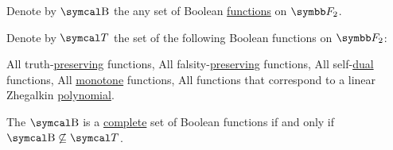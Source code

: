 \begin{Theorem}\label{thm:posts_completeness_theorem}\cite{Pelletier1990}
  Denote by \( \CB \) the any set of Boolean \hyperref[def:boolean_function]{functions} on \( \BF_2 \).

  Denote by \( \Cal{T} \) the set of the following Boolean functions on \( \BF_2 \):
  \begin{PropEnum}
     All truth-\hyperref[def:boolean_functions_in_f2/truth_preserving]{preserving} functions,
     All falsity-\hyperref[def:boolean_functions_in_f2/falsity_preserving]{preserving} functions,
     All self-\hyperref[def:boolean_functions_in_f2/self_dual]{dual} functions,
     All \hyperref[def:boolean_functions_in_f2/self_dual]{monotone} functions,
     All functions that correspond to a linear Zhegalkin \hyperref[def:zhegalkin_polynomial]{polynomial}.
  \end{PropEnum}

  The \( \CB \) is a \hyperref[def:boolean_closure]{complete} set of Boolean functions if and only if \( \CB \not\subseteq \Cal{T} \).
\end{Theorem}


